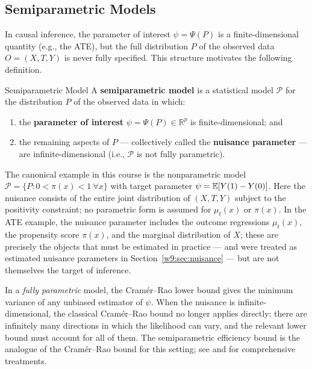 \documentclass[master.tex]{subfiles}
\begin{document}
\subsection{Semiparametric Models}
\label{w9:subsec:semiparam}

In causal inference, the parameter of interest $\psi = \Psi(P)$ is a
finite-dimensional quantity (e.g., the ATE), but the full distribution
$P$ of the observed data $O = (X, T, Y)$ is never fully specified.
This structure motivates the following definition.

\begin{defn}{Semiparametric Model}
\label{w9:defn:semiparam}
A \textbf{semiparametric model} is a statistical model $\mathcal{P}$
for the distribution $P$ of the observed data in which:
\begin{enumerate}[label=(\roman*)]
  \item the \textbf{parameter of interest} $\psi = \Psi(P) \in
    \mathbb{R}^p$ is finite-dimensional; and
  \item the remaining aspects of $P$ --- collectively called the
    \textbf{nuisance parameter} --- are infinite-dimensional (i.e.,
    $\mathcal{P}$ is not fully parametric).
\end{enumerate}
\end{defn}

The canonical example in this course is the nonparametric model
$\mathcal{P} = \{P : 0 < \pi(x) < 1\ \forall x\}$ with target
parameter $\psi = \mathbb{E}[Y(1)-Y(0)]$.  Here the nuisance consists of the
entire joint distribution of $(X, T, Y)$ subject to the positivity
constraint; no parametric form is assumed for $\mu_t(x)$ or $\pi(x)$.
In the ATE example, the nuisance parameter includes the outcome
regressions $\mu_t(x)$, the propensity score $\pi(x)$, and the
marginal distribution of $X$; these are precisely the objects that must
be estimated in practice --- and were treated as estimated nuisance
parameters in Section~\ref{w9:sec:nuisance} --- but are not themselves
the target of inference.

\begin{remark}
\label{w9:rem:vs-param}
In a \emph{fully parametric} model, the Cramér--Rao lower bound gives
the minimum variance of any unbiased estimator of $\psi$.  When the
nuisance is infinite-dimensional, the classical Cramér--Rao bound no
longer applies directly: there are infinitely many directions in which
the likelihood can vary, and the relevant lower bound must account for
all of them.  The semiparametric efficiency bound is the analogue of
the Cramér--Rao bound for this setting; see \citet{bickel1993} and
\citet{tsiatis2006semiparametric} for comprehensive treatments.
\end{remark}
\end{document}
